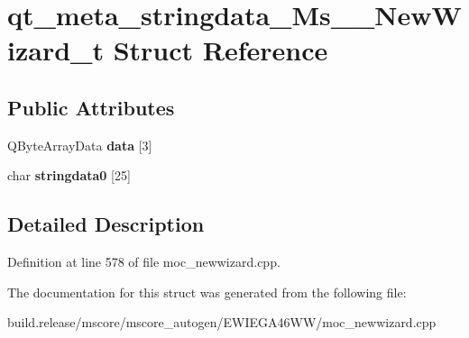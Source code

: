 \hypertarget{structqt__meta__stringdata___ms_____new_wizard__t}{}\section{qt\+\_\+meta\+\_\+stringdata\+\_\+\+Ms\+\_\+\+\_\+\+New\+Wizard\+\_\+t Struct Reference}
\label{structqt__meta__stringdata___ms_____new_wizard__t}
\subsection*{Public Attributes}
\begin{DoxyCompactItemize}
\item 
\mbox{\label{structqt__meta__stringdata___ms_____new_wizard__t_a3f545728f068dcaa1069c9af52799a01}} 
Q\+Byte\+Array\+Data {\bfseries data} \mbox{[}3\mbox{]}
\item 
\mbox{\label{structqt__meta__stringdata___ms_____new_wizard__t_a3fa07b094e0099db7644eba498e93def}} 
char {\bfseries stringdata0} \mbox{[}25\mbox{]}
\end{DoxyCompactItemize}


\subsection{Detailed Description}


Definition at line 578 of file moc\+\_\+newwizard.\+cpp.



The documentation for this struct was generated from the following file\+:\begin{DoxyCompactItemize}
\item 
build.\+release/mscore/mscore\+\_\+autogen/\+E\+W\+I\+E\+G\+A46\+W\+W/moc\+\_\+newwizard.\+cpp\end{DoxyCompactItemize}
